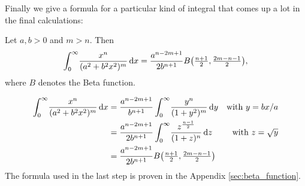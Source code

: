 Finally we give a formula for a particular kind of integral that comes up a lot
in the final calculations:
\begin{Lemma}
  \label{lem:beta_function_formula}
  Let $a, b > 0$ and $m > n$. Then
  \begin{align*}
    \Integ[\infty]{0}{x}{\frac{x^n}{(a^2 + b^2 x^2)^{m}}} =
    \frac{a^{n-2m+1}}{2b^{n+1}}B\bigl(\tfrac{n+1}{2}, \tfrac{2m - n -
    1}{2}\bigr),
  \end{align*}
  where $B$ denotes the Beta function.
  \begin{Proof}
    \begin{align*}
      \Integ[\infty]{0}{x}{\frac{x^n}{(a^2 + b^2 x^2)^{m}}} 
      &= \frac{a^{n-2m+1}}{b^{n+1}} \Integ[\infty]{0}{y}{\frac{y^n}{(1 +
  y^2)^m}}
        &\text{with $y = bx / a$} \\
        &= \frac{a^{n - 2m + 1}}{2b^{n+1}}
        \Integ[\infty]{0}{z}{\frac{z^{\frac{n-1}{2}}}{(1 + z)^n}}
        &\text{with $z = \sqrt{y}$}\\
        &= \frac{a^{n-2m+1}}{2b^{n+1}}B\bigl(\tfrac{n+1}{2}, \tfrac{2m - n -
      1}{2}\bigr)
    \end{align*}
    The formula used in the last step is proven in the Appendix
    \ref{sec:beta_function}.
  \end{Proof}
\end{Lemma}
